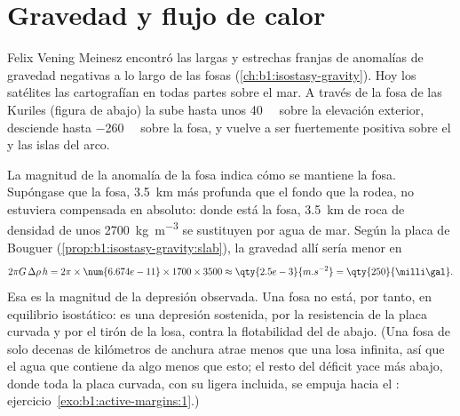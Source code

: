 \section{Gravedad y flujo de calor}\label{sec:b1:active-margins:gravity-heat}

Felix Vening Meinesz encontró las largas y estrechas franjas de anomalías de gravedad negativas a lo largo de las fosas
(\cref{ch:b1:isostasy-gravity}). Hoy los satélites las cartografían en todas partes sobre el mar. A través de la fosa de las Kuriles (figura de
abajo) la  sube hasta unos \qty{40}{\milli\gal} sobre la elevación exterior, desciende hasta \qty{-260}{\milli\gal}
sobre la fosa, y vuelve a ser fuertemente positiva sobre el  y las islas del arco.

La magnitud de la anomalía de la fosa indica cómo se mantiene la fosa. Supóngase que la fosa, \qty{3.5}{km} más profunda que el fondo que la
rodea, no estuviera compensada en absoluto: donde está la fosa, \qty{3.5}{km} de roca de densidad de unos \qty{2700}{kg.m^{-3}} se sustituyen
por agua de mar. Según la placa de Bouguer (\cref{prop:b1:isostasy-gravity:slab}), la gravedad allí sería menor en
\[
  2\pi G\,\Delta\rho\,h = 2\pi \times \num{6.674e-11} \times 1700 \times 3500
  \approx \qty{2.5e-3}{m.s^{-2}} = \qty{250}{\milli\gal} .
\]
Esa es la magnitud de la depresión observada. Una fosa no está, por tanto, en equilibrio isostático: es una depresión sostenida, por la
resistencia de la placa curvada y por el tirón de la losa, contra la flotabilidad del  de abajo. (Una fosa de solo decenas de kilómetros
de anchura atrae menos que una losa infinita, así que el agua que contiene da algo menos que esto; el resto del déficit yace más abajo, donde
toda la placa curvada, con su  ligera incluida, se empuja hacia el : ejercicio~\ref{exo:b1:active-margins:1}.)

